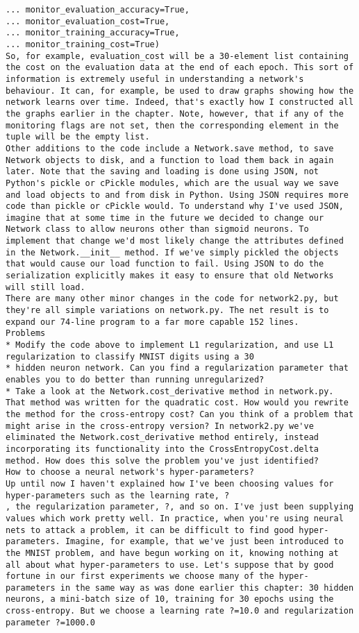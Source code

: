 \begin{lstlisting}
... monitor_evaluation_accuracy=True,
... monitor_evaluation_cost=True,
... monitor_training_accuracy=True,
... monitor_training_cost=True)
So, for example, evaluation_cost will be a 30-element list containing the cost on the evaluation data at the end of each epoch. This sort of information is extremely useful in understanding a network's behaviour. It can, for example, be used to draw graphs showing how the network learns over time. Indeed, that's exactly how I constructed all the graphs earlier in the chapter. Note, however, that if any of the monitoring flags are not set, then the corresponding element in the tuple will be the empty list.
Other additions to the code include a Network.save method, to save Network objects to disk, and a function to load them back in again later. Note that the saving and loading is done using JSON, not Python's pickle or cPickle modules, which are the usual way we save and load objects to and from disk in Python. Using JSON requires more code than pickle or cPickle would. To understand why I've used JSON, imagine that at some time in the future we decided to change our Network class to allow neurons other than sigmoid neurons. To implement that change we'd most likely change the attributes defined in the Network.__init__ method. If we've simply pickled the objects that would cause our load function to fail. Using JSON to do the serialization explicitly makes it easy to ensure that old Networks will still load.
There are many other minor changes in the code for network2.py, but they're all simple variations on network.py. The net result is to expand our 74-line program to a far more capable 152 lines.
Problems
* Modify the code above to implement L1 regularization, and use L1 regularization to classify MNIST digits using a 30
* hidden neuron network. Can you find a regularization parameter that enables you to do better than running unregularized?
* Take a look at the Network.cost_derivative method in network.py. That method was written for the quadratic cost. How would you rewrite the method for the cross-entropy cost? Can you think of a problem that might arise in the cross-entropy version? In network2.py we've eliminated the Network.cost_derivative method entirely, instead incorporating its functionality into the CrossEntropyCost.delta method. How does this solve the problem you've just identified?
How to choose a neural network's hyper-parameters?
Up until now I haven't explained how I've been choosing values for hyper-parameters such as the learning rate, ?
, the regularization parameter, ?, and so on. I've just been supplying values which work pretty well. In practice, when you're using neural nets to attack a problem, it can be difficult to find good hyper-parameters. Imagine, for example, that we've just been introduced to the MNIST problem, and have begun working on it, knowing nothing at all about what hyper-parameters to use. Let's suppose that by good fortune in our first experiments we choose many of the hyper-parameters in the same way as was done earlier this chapter: 30 hidden neurons, a mini-batch size of 10, training for 30 epochs using the cross-entropy. But we choose a learning rate ?=10.0 and regularization parameter ?=1000.0

\end{lstlisting}
